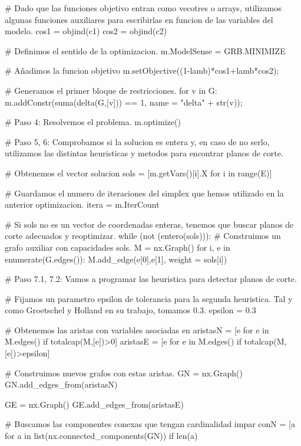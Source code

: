 \documentclass[twoside,a4paper,openright,12pt,tikz]{book}
\begin{document}
\begin{pythone}
    # Dado que las funciones objetivo entran como vecotres o arrays, utilizamos algunas funciones auxiliares para escribirlas en funcion de las variables del modelo.      
    cos1 = objind(c1)
    cos2 = objind(c2)
    
    # Definimos el sentido de la optimizacion.
    m.ModelSense = GRB.MINIMIZE
    
    # Añadimos la funcion objetivo
    m.setObjective((1-lamb)*cos1+lamb*cos2); 
    
    # Generamos el primer bloque de restricciones.
    for v in G:
        m.addConstr(suma(delta(G,[v])) == 1, name = "delta" + str(v));
    
    # Paso 4: Resolvemos el problema.
    m.optimize()
    
    # Paso 5, 6: Comprobamos si la solucion es entera y, en caso de no serlo, utilizamos las distintas heuristicas y metodos para encontrar planos de corte.
        
    # Obtenemos el vector solucion
    sols = [m.getVars()[i].X for i in range(E)]
    
    # Guardamos el numero de iteraciones del simplex que hemos utilizado en la anterior optimizacion.
    itera = m.IterCount
    
   	# Si sols no es un vector de coordenadas enteras, tenemos que buscar planos de corte adecuados y reoptimizar.
    while (not (entero(sols))):     
        # Construimos un grafo auxiliar con capacidades sols.
        M = nx.Graph()
        for i, e in enumerate(G.edges()):
            M.add_edge(e[0],e[1], weight = sols[i])
        
        # Paso 7.1, 7.2: Vamos a programar las heuristica para detectar planos de corte.
        
        # Fijamos un parametro epsilon de tolerancia para la segunda heuristica. Tal y como Groetschel y Holland en su trabajo, tomamos 0.3. 
        epsilon = 0.3 
        
        # Obtenemos las aristas con variables asociadas en
        aristasN = [e for e in M.edges() if totalcap(M,[e])>0]
        aristasE = [e for e in M.edges() if totalcap(M,[e])>epsilon]
            
        # Construimos nuevos grafos con estas aristas.
        GN = nx.Graph()
        GN.add_edges_from(aristasN)
        
        GE = nx.Graph()
        GE.add_edges_from(aristasE)
        
        # Buscamos las componentes conexas que tengan cardinalidad impar
        conN = [a for a in list(nx.connected_components(GN)) if len(a) %
        

\end{pythone}
\end{document}

